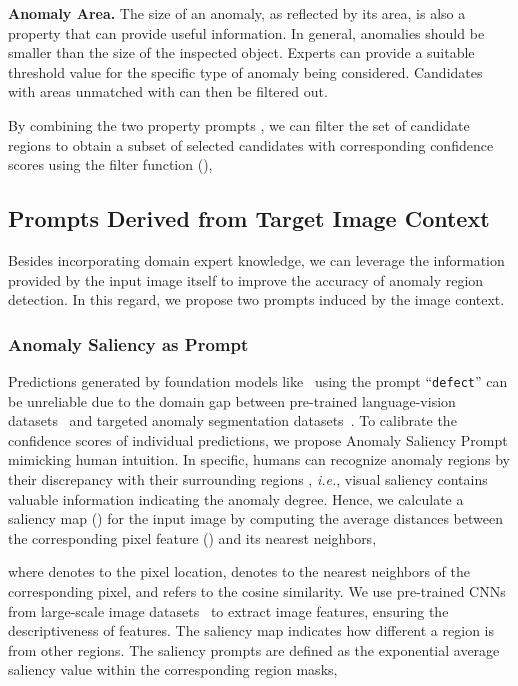 \documentclass{article}
\begin{document}
\noindent\textbf{Anomaly Area.} The size of an anomaly, as reflected by its area, is also a property that can provide useful information. In general, anomalies should be smaller than the size of the inspected object. Experts can provide a suitable threshold value  for the specific type of anomaly being considered. Candidates with areas unmatched with  can then be filtered out.

By combining the two property prompts , we can filter the set of candidate regions  to obtain a subset of selected candidates  with corresponding confidence scores  using the filter function (),



\subsection{Prompts Derived from Target Image Context}

Besides incorporating domain expert knowledge, we can leverage the information provided by the input image itself to improve the accuracy of anomaly region detection. In this regard, we propose two prompts induced by the image context.


\subsubsection{Anomaly Saliency as Prompt}
Predictions generated by foundation models like~\cite{liu2023grounding} using the prompt ``\verb|defect|'' can be unreliable due to the domain gap between pre-trained language-vision datasets~\cite{Laion400} and targeted anomaly segmentation datasets~\cite{bergmann2019mvtec,zou2022spot}. To calibrate the confidence scores of individual predictions, we propose Anomaly Saliency Prompt mimicking human intuition. In specific, humans can recognize anomaly regions by their discrepancy with their surrounding regions \cite{aota2023zero}, \textit{i.e.}, visual saliency contains valuable information indicating the anomaly degree. Hence, we calculate a saliency map () for the input image by computing the average distances between the corresponding pixel feature () and its  nearest neighbors, 

where  denotes to the pixel location,  denotes to the  nearest neighbors of the corresponding pixel, and  refers to the cosine similarity. We use pre-trained CNNs from large-scale image datasets~\cite{hinton2012imagenet} to extract image features, ensuring the descriptiveness of features. The saliency map indicates how different a region is from other regions. The saliency prompts  are defined as the exponential average saliency value within the corresponding region masks, 
\end{document}
